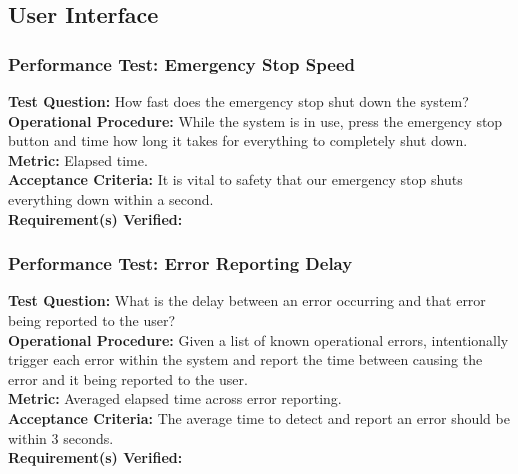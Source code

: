 
\subsection{User Interface}
\label{sec:verification_ui}

\subsubsection{Performance Test: Emergency Stop Speed}
\label{sec:ui_pt_stop_speed}
\textbf{Test Question:} How fast does the emergency stop shut down the system? \\
\textbf{Operational Procedure:} While the system is in use, press the emergency stop button and time how long it takes for everything to completely shut down.\\
\textbf{Metric:} Elapsed time. \\
\textbf{Acceptance Criteria:} It is vital to safety that our emergency stop shuts everything down within a second. \\
\textbf{Requirement(s) Verified:}  \\

\subsubsection{Performance Test: Error Reporting Delay}
\label{sec:ui_pt_error_delay}
\textbf{Test Question:} What is the delay between an error occurring and that error being reported to the user? \\
\textbf{Operational Procedure:} Given a list of known operational errors, intentionally trigger each error within the system and report the time between causing the error and it being reported to the user. \\
\textbf{Metric:} Averaged elapsed time across error reporting. \\
\textbf{Acceptance Criteria:} The average time to detect and report an error should be within 3 seconds. \\
\textbf{Requirement(s) Verified:}  \\

